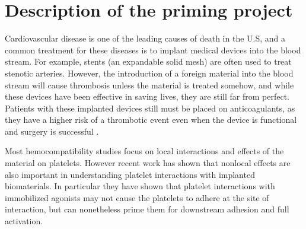 




\section{Description of the priming project}
\label{sec:priming-project}

Cardiovascular disease is one of the leading causes of death in the
U.S, and a common treatment for these diseases is to implant medical
devices into the blood stream. For example, stents (an expandable
solid mesh) are often used to treat stenotic arteries. However, the
introduction of a foreign material into the blood stream will cause
thrombosis unless the material is treated somehow, and while these
devices have been effective in saving lives, they are still far from
perfect. Patients with these implanted devices still must be placed on
anticoagulants, as they have a higher risk of a thrombotic event even
when the device is functional and surgery is successful
\cite{Cannegieter1994}.

Most hemocompatibility studies focus on local interactions and effects
of the material on platelets. However recent work
\cite{Corum2011,Corum2012} has shown that nonlocal effects are also
important in understanding platelet interactions with implanted
biomaterials. In particular they have shown that platelet interactions
with immobilized agonists may not cause the platelets to adhere at the
site of interaction, but can nonetheless prime them for downstream
adhesion and full activation.

